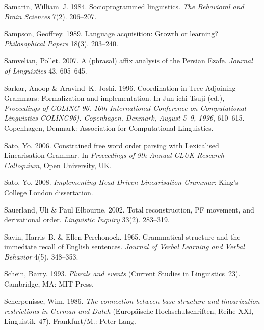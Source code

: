 \begin{thebibliography}{1420}
Samarin, William~J. 1984.
\newblock Socioprogrammed linguistics.
\newblock \emph{The Behavioral and Brain Sciences} 7(2). 206--207.

Sampson, Geoffrey. 1989.
\newblock Language acquisition: Growth or learning?
\newblock \emph{Philosophical Papers} 18(3). 203--240.

Samvelian, Pollet. 2007.
\newblock A (phrasal) affix analysis of the {Persian Ezafe}.
\newblock \emph{Journal of Linguistics} 43. 605--645.

Sarkar, Anoop \& Aravind~K. Joshi. 1996.
\newblock Coordination in {Tree Adjoining Grammars}: Formalization and
  implementation.
\newblock In {Jun-ichi} Tsuji (ed.), \emph{Proceedings of {COLING-96. 16th
  International Conference on Computational Linguistics COLING96). Copenhagen,
  Denmark, August 5--9, 1996}}, 610--615. Copenhagen, Denmark: Association for
  Computational Linguistics.

Sato, Yo. 2006.
\newblock Constrained free word order parsing with {Lexicalised Linearisation
  Grammar}.
\newblock In \emph{Proceedings of {9th Annual CLUK Research Colloquium}}, Open
  University, UK.

Sato, Yo. 2008.
\newblock \emph{Implementing {Head-Driven Linearisation Grammar}}: King's
  College London dissertation.

Sauerland, Uli \& Paul Elbourne. 2002.
\newblock Total reconstruction, {PF} movement, and derivational order.
\newblock \emph{Linguistic Inquiry} 33(2). 283--319.

Savin, Harris~B. \& Ellen Perchonock. 1965.
\newblock Grammatical structure and the immediate recall of {English}
  sentences.
\newblock \emph{Journal of Verbal Learning and Verbal Behavior} 4(5). 348--353.

Schein, Barry. 1993.
\newblock \emph{Plurals and events} (Current Studies in Linguistics~23).
\newblock Cambridge, MA: MIT Press.

Scherpenisse, Wim. 1986.
\newblock \emph{The connection between base structure and linearization
  restrictions in {German} and {Dutch}} (Europ{\"a}ische Hochschulschriften,
  Reihe {XXI}, Linguistik~47).
\newblock Frankfurt/M.: Peter Lang.


\end{thebibliography}
